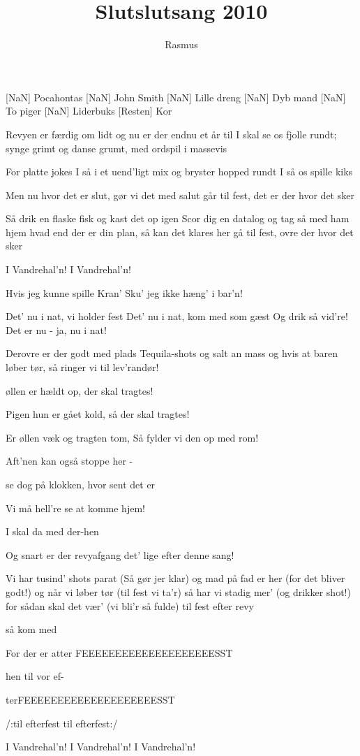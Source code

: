 \documentclass[a4paper,11pt]{article}
\title{Slutslutsang 2010}
\author{Rasmus}
\begin{document}
\maketitle

\begin{roles}
[NaN] Pocahontas
[NaN] John Smith
[NaN] Lille dreng
[NaN] Dyb mand
[NaN] To piger
[NaN] Liderbuks
[Resten] Kor
\end{roles}

\begin{song}
 Revyen er færdig om lidt
og nu er der endnu et år
til I skal se os fjolle rundt;
synge grimt og danse grumt,
med ordspil i massevis

 For platte jokes I så
i et uend'ligt mix
og bryster hopped rundt
I så os spille kiks

 Men nu hvor det er slut,
gør vi det med salut
går til fest, det er der hvor det sker

 Så drik en flaske fisk
og kast det op igen
Scor dig en datalog
og tag så med ham hjem
hvad end der er din plan,
så kan det klares her
gå til fest, ovre der hvor det sker

 I Vandrehal'n! I Vandrehal'n!

 Hvis jeg kunne spille Kran'
Sku' jeg ikke hæng' i bar'n!

 Det' nu i nat, vi holder fest
Det' nu i nat, kom med som gæst
Og drik så vid're! Det er nu - ja, nu i nat!

 Derovre er der godt med plads
Tequila-shots og salt an mass
og hvis at baren løber tør,
så ringer vi til lev'randør!

 øllen er hældt op, der skal tragtes!

 Pigen hun er gået kold, så der skal tragtes!

 Er øllen væk og tragten tom,
Så fylder vi den op med rom!

 Aft'nen kan også stoppe her -

 se dog på klokken, hvor sent det er

 Vi må hell're se at komme hjem!

 I skal da med der-hen

 Og snart er der revyafgang
det' lige efter denne sang!

 Vi har tusind' shots parat
(Så gør jer klar)
og mad på fad er her
(for det bliver godt!)
og når vi løber tør
(til fest vi ta'r)
så har vi stadig mer'
(og drikker shot!)
for sådan skal det vær'
(vi bli'r så fulde)
til fest efter revy

 så kom med

 For der er atter FEEEEEEEEEEEEEEEEEEEESST

 hen til vor ef-

 terFEEEEEEEEEEEEEEEEEEEESST

 /:til efterfest
til efterfest:/

 I Vandrehal'n!
I Vandrehal'n!
I Vandrehal'n!
\end{song}
\end{document}
